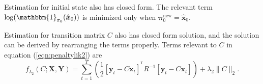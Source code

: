 \documentclass[fleqn,12pt]{article}
\let\oldref\ref
\renewcommand{\ref}[1]{(\oldref{#1})}
\newcommand{\T}{^{\ensuremath{\mathsf{T}}}}           %
\providecommand{\mb}[1]{\boldsymbol{#1}}
\newcommand{\bx}{\mb{x}}
\newcommand{\by}{\mb{y}}
\newcommand{\bX}{\mb{X}}
\newcommand{\bY}{\mb{Y}}
\begin{document}
Estimation for initial state also has closed form. The relevant term $\log(\mathbbm{1}_{\mathbf{\pi}_0}(\hat{\bx}_0))$ is minimized only when $\mathbf{\pi}_0^{\text{new}} = \hat{\bx}_0$.

Estimation for transition matrix $C$ also has closed form solution, and the solution can be derived by rearranging the terms properly. Terms relevant to $C$ in equation \ref{eqn:penaltylik2} are
\begin{equation}\label{eq:penaltylik1}
f_{\lambda_2}(C;\bX,\bY) = \sum\limits_{t=1}^{T}\left(\frac{1}{2}[\by_t-C\bx_t]^{\T}R^{-1}[\by_t-C\bx_t]\right)+\lambda_2 \|C\|_2.
\end{equation}
\end{document}

